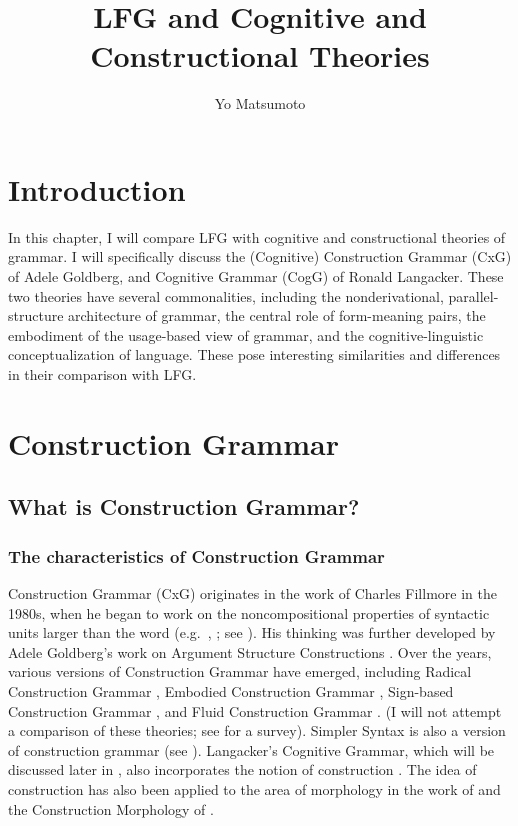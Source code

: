 \documentclass[output=paper,japanesefont,hidelinks]{langscibook}
\title{LFG and Cognitive and Constructional Theories}
\author{Yo Matsumoto\affiliation{National Institute for Japanese Language and Linguistics}}
\begin{document}
\maketitle
\label{chap:ConstructionGrammar}

\section{Introduction}
\label{sec:cg:1}

In this chapter, I will compare LFG with cognitive and constructional theories of grammar. I will specifically discuss the (Cognitive) Construction Grammar (CxG) of Adele Goldberg, and Cognitive Grammar (CogG) of Ronald Langacker. These two theories have several commonalities, including the nonderivational, parallel-structure  architecture of grammar, the central role of form-meaning pairs, the embodiment of the usage-based view of grammar, and the cognitive-linguistic conceptualization of language. These pose interesting similarities and differences in their comparison with LFG.

\section{Construction Grammar}
\label{sec:cg:2}

\subsection{ What is Construction Grammar?}
\label{sec:cg:2.1}

\subsubsection{The characteristics of Construction Grammar}
\label{sec:cg:2.1.1}

Construction Grammar (CxG) originates in the work of Charles Fillmore in the 1980s, when he began to work on the noncompositional properties of syntactic units larger than the word (e.g.\ \citealt{Fillmore1988}, \citealt{FillmoreKayOConnor1988}; see \citealt{Fillmore2020}). His thinking was further developed by Adele Goldberg's work on Argument Structure Constructions \citep{goldberg1995constructions,Goldberg2003,Goldberg2006,Goldberg2019}. Over the years, various versions of Construction Grammar have emerged, including Radical Construction Grammar \citep{Croft2001}, Embodied Construction Grammar \citep{BergenChang2005}, Sign-based Construction Grammar \citep{BoasSag2012}, and Fluid Construction Grammar \citep{Steels2011}.  (I will not attempt a comparison of these theories; see \citealt{HoffmannTrousdale2013} for a survey).  Simpler Syntax is also a version of construction grammar (see ). Langacker's Cognitive Grammar, which will be discussed later in , also incorporates the notion of construction \citep{Langacker2003,Langacker2005}. The idea of construction has also been applied to the area of morphology in the work of \citet{Riehemann98a} and the Construction Morphology of \citet{Booij2010,Booij2018}.
\end{document}
